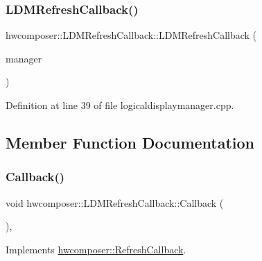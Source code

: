 \subsubsection{\texorpdfstring{L\+D\+M\+Refresh\+Callback()}{LDMRefreshCallback()}}
{\footnotesize\ttfamily hwcomposer\+::\+L\+D\+M\+Refresh\+Callback\+::\+L\+D\+M\+Refresh\+Callback (\begin{DoxyParamCaption}\item[{\mbox{\hyperlink{classhwcomposer_1_1LogicalDisplayManager}{Logical\+Display\+Manager}} $\ast$}]{manager }\end{DoxyParamCaption})\hspace{0.3cm}{\ttfamily [inline]}}



Definition at line 39 of file logicaldisplaymanager.\+cpp.


\begin{DoxyCode}{0}
\end{DoxyCode}


\subsection{Member Function Documentation}
\mbox{\label{classhwcomposer_1_1LDMRefreshCallback_a0bc9239fba543393d72ea68f9ee5abab}} 
\subsubsection{\texorpdfstring{Callback()}{Callback()}}
{\footnotesize\ttfamily void hwcomposer\+::\+L\+D\+M\+Refresh\+Callback\+::\+Callback (\begin{DoxyParamCaption}\item[{uint32\+\_\+t}]{ }\end{DoxyParamCaption})\hspace{0.3cm}{\ttfamily [inline]}, {\ttfamily [virtual]}}



Implements \mbox{\hyperlink{classhwcomposer_1_1RefreshCallback_a5637a4b1437bbf8c93d8356addbf7c87}{hwcomposer\+::\+Refresh\+Callback}}.



